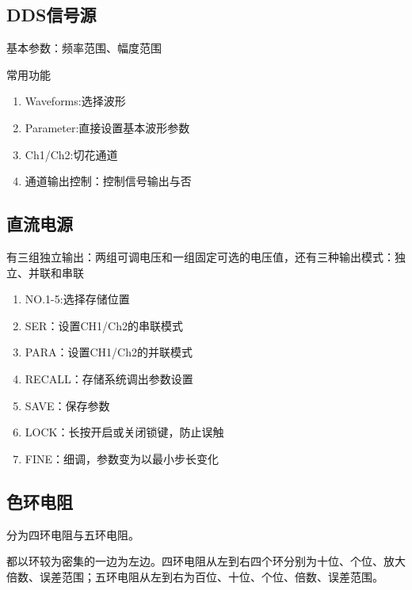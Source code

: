 \documentclass{ctexart}
\begin{document}
\subsection{DDS信号源}
基本参数：频率范围、幅度范围

常用功能
\begin{enumerate}
    \item Waveforms:选择波形
    \item Parameter:直接设置基本波形参数
    \item Ch1/Ch2:切花通道
    \item 通道输出控制：控制信号输出与否
\end{enumerate}
\subsection{直流电源}
有三组独立输出：两组可调电压和一组固定可选的电压值，还有三种输出模式：独立、并联和串联
\begin{enumerate}
    \item NO.1-5:选择存储位置
    \item SER：设置CH1/Ch2的串联模式
    \item PARA：设置CH1/Ch2的并联模式
    \item RECALL：存储系统调出参数设置
    \item SAVE：保存参数
    \item LOCK：长按开启或关闭锁键，防止误触
    \item FINE：细调，参数变为以最小步长变化
\end{enumerate}
\subsection{色环电阻}
分为四环电阻与五环电阻。

都以环较为密集的一边为左边。四环电阻从左到右四个环分别为十位、个位、放大倍数、误差范围；五环电阻从左到右为百位、十位、个位、倍数、误差范围。
\end{document}
